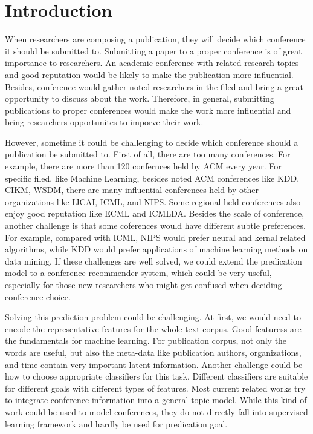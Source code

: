 \section{Introduction}
When researchers are composing a publication, they will decide which conference it
should be submitted to. Submitting a paper to a proper conference is of great
importance to researchers. An academic conference with related research topics
and good reputation would be likely to make the publication more influential.
Besides, conference would gather noted researchers in the filed and bring a
great opportunity to discuss about the work. Therefore, in general, submitting
publications to proper conferences would make the work more influential and
bring researchers opportunites to imporve their work.

However, sometime it could be challenging to decide which conference should a
publication be submitted to. First of all, there are too many conferences. For
example, there are more than 120 confernces held by ACM every year. For specific filed,
like Machine Learning, besides noted ACM conferences like KDD, CIKM, WSDM, there
are many influential conferences held by other organizations like IJCAI,
ICML, and NIPS. Some regional held conferences also enjoy good reputation like
ECML and ICMLDA. Besides the scale of conference, another challenge is that some
coferences would have different subtle preferences. For example, compared with
ICML, NIPS would prefer neural and kernal related algorithms, while KDD would
prefer applications of machine learning methods on data mining. If these
challenges are well solved, we could extend the predication model to a conference
recommender system, which could be very useful, especially for those new
researchers who might get confused when deciding conference choice.

Solving this prediction problem could be challenging. At first, we would need to
encode the representative features for the whole text corpus. Good featuress are
the fundamentals for machine learning. For publication corpus, not only the words
are useful, but also the meta-data like publication authors, organizations, and
time contain very important latent information. Another challenge could be how
to choose appropriate classifiers for this task. Different classifiers are
suitable for different goals with different types of features. Most current
related works try to integrate conference information into a general topic
model. While this kind of work \cite{tang2008arnetminer} \cite{rosen2004author}
could be used to model conferences, they do not directly fall into supervised
learning framework and hardly be used for predication goal.

